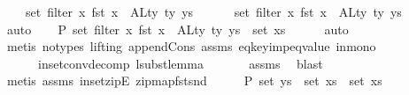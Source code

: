 \begin{isabellebody}
\ \ \ \ set\ {\isacharparenleft}{\kern0pt}filter\ {\isacharparenleft}{\kern0pt}{\isasymlambda}x{\isachardot}{\kern0pt}\ fst\ x\ {\isasymnotin}\ ALty\ ty{\isacharparenright}{\kern0pt}\ ys{\isacharparenright}{\kern0pt}\ {\isasymunion}\ \isanewline
\ \ \ \ set\ {\isacharparenleft}{\kern0pt}filter\ {\isacharparenleft}{\kern0pt}{\isasymlambda}x{\isachardot}{\kern0pt}\ fst\ x\ {\isasymin}\ ALty\ ty{\isacharparenright}{\kern0pt}\ ys{\isacharparenright}{\kern0pt}{\isachardoublequoteclose}\isanewline
\ \ \ \ \isamarkupfalse%
\ auto\isanewline
\isanewline
\ \ \isamarkupfalse%
\ P{}{\isacharcolon}{\kern0pt}\ {\isachardoublequoteopen}set\ {\isacharparenleft}{\kern0pt}filter\ {\isacharparenleft}{\kern0pt}{\isasymlambda}x{\isachardot}{\kern0pt}\ fst\ x\ {\isasymin}\ ALty\ ty{\isacharparenright}{\kern0pt}\ ys{\isacharparenright}{\kern0pt}\ {\isacharequal}{\kern0pt}\ set\ xs{\isachardoublequoteclose}\isanewline
\ \ \ \ \isamarkupfalse%
\ auto\isanewline
\ \ \ \ \isamarkupfalse%
\ {\isacharparenleft}{\kern0pt}metis\ {\isacharparenleft}{\kern0pt}no{\isacharunderscore}{\kern0pt}types{\isacharcomma}{\kern0pt}\ lifting{\isacharparenright}{\kern0pt}\ append{\isacharunderscore}{\kern0pt}Cons\ assms{\isacharparenleft}{\kern0pt}{}{\isacharcomma}{\kern0pt}{}{\isacharcomma}{\kern0pt}{}{\isacharcomma}{\kern0pt}{}{\isacharparenright}{\kern0pt}\ eq{\isacharunderscore}{\kern0pt}key{\isacharunderscore}{\kern0pt}imp{\isacharunderscore}{\kern0pt}eq{\isacharunderscore}{\kern0pt}value\ in{\isacharunderscore}{\kern0pt}mono\isanewline
\ \ \ \ \ \ in{\isacharunderscore}{\kern0pt}set{\isacharunderscore}{\kern0pt}conv{\isacharunderscore}{\kern0pt}decomp\ lsubst{\isacharunderscore}{\kern0pt}lemma{}{\isacharparenright}{\kern0pt}\ \isanewline
\ \ \ \ \isamarkupfalse%
\ assms{\isacharparenleft}{\kern0pt}{}{\isacharparenright}{\kern0pt}\ \isamarkupfalse%
\ blast\isanewline
\ \ \ \ \isamarkupfalse%
\ {\isacharparenleft}{\kern0pt}metis\ assms{\isacharparenleft}{\kern0pt}{}{\isacharparenright}{\kern0pt}\ in{\isacharunderscore}{\kern0pt}set{\isacharunderscore}{\kern0pt}zipE\ zip{\isacharunderscore}{\kern0pt}map{\isacharunderscore}{\kern0pt}fst{\isacharunderscore}{\kern0pt}snd{\isacharparenright}{\kern0pt}\isanewline
\isanewline
\ \ \isamarkupfalse%
\ \isamarkupfalse%
\ P{}{\isacharcolon}{\kern0pt}\ {\isachardoublequoteopen}set\ ys\ {\isacharequal}{\kern0pt}\ set\ xs{}\ {\isasymunion}\ set\ xs{\isachardoublequoteclose}\isanewline

\end{isabellebody}
